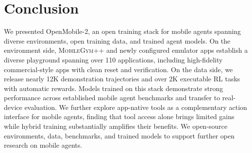 \section{Conclusion}
\label{sec:conclusion}

We presented OpenMobile-2, an open training stack for mobile agents spanning
diverse environments, open training data, and trained agent models. On the environment side, \textsc{MobileGym++} and newly configured emulator apps establish a diverse playground spanning over 110 applications, including high-fidelity commercial-style apps with clean reset and verification.
On the data side, we release nearly 12K demonstration trajectories and over 2K executable
RL tasks with automatic rewards. Models trained on this stack demonstrate
strong performance across established mobile agent benchmarks and transfer to real-device evaluation. 
We further explore app-native tools as a complementary action interface for mobile agents, finding that tool access alone brings limited gains while hybrid training substantially amplifies their benefits.
We open-source environments, data, benchmarks, and trained models to support further open research on mobile agents.